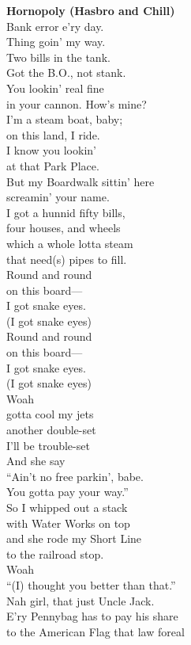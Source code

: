 \documentclass{article}
\begin{document}
\begin{center}
\newcommand{\vs}{\vspace*{2ex}}
\noindent
\textbf{Hornopoly (Hasbro and Chill)} \\
\vs
Bank error e'ry day. \\
Thing goin' my way. \\
Two bills in the tank. \\
Got the B.O., not stank. \\
\vs
You lookin' real fine \\
in your cannon. How's mine? \\
I'm a steam boat, baby; \\
on this land, I ride. \\
I know you lookin' \\
at that Park Place. \\
But my Boardwalk sittin' here \\
screamin' your name. \\
\vs
I got a hunnid fifty bills, \\
four houses, and wheels \\
which a whole lotta steam \\
that need(s) pipes to fill. \\
\vs
Round and round \\
on this board--- \\
I got snake eyes. \\
(I got snake eyes) \\
\vs
Round and round \\
on this board--- \\
I got snake eyes. \\
(I got snake eyes) \\
\vs
Woah \\
gotta cool my jets \\
another double-set \\
I'll be trouble-set \\
\vs
\vs
And she say \\
``Ain't no free parkin', babe. \\
You gotta pay your way.'' \\
\vs
So I whipped out a stack \\
with Water Works on top \\
and she rode my Short Line \\
to the railroad stop. \\
\vs
Woah \\
``(I) thought you better than that.'' \\
Nah girl, that just Uncle Jack. \\
\vs
E'ry Pennybag has to pay his share \\
to the American Flag that law foreal \\
\end{center}
\end{document}
